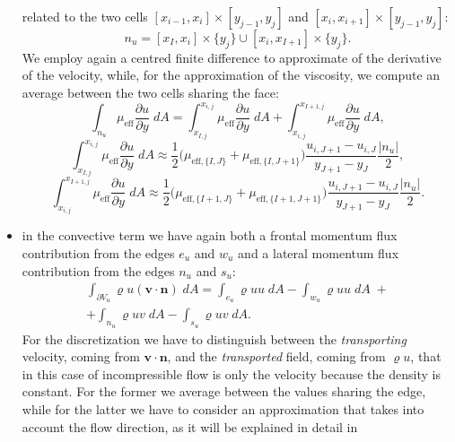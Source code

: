 \begin{itemize}
	related to the two cells $[x_{i-1},x_i]\times[y_{j-1},y_j]$ and 
	$[x_i,x_{i+1}]\times[y_{j-1},y_j]$:
	\begin{equation}
	n_u = [x_I,x_i]\times \{y_j\} \cup [x_i,x_{I+1}] \times \{y_j\}.
	\end{equation}
	We employ again a centred finite difference to approximate of the 
	derivative of the velocity, while, for the approximation of the viscosity, 
	we compute an average between the two cells sharing the face:
	\begin{equation}
	\int_{n_u} \mu_\text{eff} \frac{\partial u}{\partial y} \; dA = 
	\int_{x_{I,j}}^{x_{i,j}} \mu_\text{eff} \frac{\partial u}{\partial y} \; dA 
	+\int_{x_{i,j}}^{x_{I+1,j}} \mu_\text{eff} \frac{\partial u}{\partial y} \; 
	dA,
	\end{equation}
	\begin{equation*}
	\int_{x_{I,j}}^{x_{i,j}} \mu_\text{eff} \frac{\partial u}{\partial y} \; dA 
	\approx \frac{1}{2}\big(\mu_{\text{eff},\{I,J\}}+\mu_{\text{eff},\{I,J+1\}} 
	\big) \frac{u_{i,J+1}-u_{i,J}}{y_{J+1}-y_J} \frac{|n_u|}{2},
	\end{equation*}
	\begin{equation*}
	\int_{x_{i,j}}^{x_{I+1,j}} \mu_\text{eff} \frac{\partial u}{\partial y} \; 
	dA \approx \frac{1}{2}\big( \mu_{\text{eff},\{I+1,J\}}+ 
	\mu_{\text{eff},\{I+1,J+1\}} \big) \frac{u_{i,J+1}-u_{i,J}}{y_{J+1}-y_J} 
	\frac{|n_u|}{2}.
	\end{equation*}
	\item in the convective term we have again both a frontal momentum flux 
	contribution from the edges $e_u$ and $w_u$ and a lateral momentum flux 
	contribution from the edges $n_u$ and $s_u$:
	\begin{multline}
	\int_{\partial V_u} \varrho u (\mathbf{v} \cdot \mathbf{n}) \; dA = 
	\int_{e_u} \varrho u u \; dA - \int_{w_u} \varrho u u \; dA \; +\\
	+ \int_{n_u} \varrho u v \; dA  -\int_{s_u} \varrho u v \; dA.
	\end{multline}
	For the discretization we have to distinguish between the 
	\emph{transporting} velocity, coming from $\mathbf{v} \cdot \mathbf{n}$, 
	and the \emph{transported} field, coming from $\varrho u$, that in this 
	case of incompressible flow is only the velocity because the density is 
	constant. For the former we average between the values sharing the edge, 
	while for the latter we have to consider an approximation that takes into 
	account the flow direction, as it will be explained in detail in 

\end{itemize}
